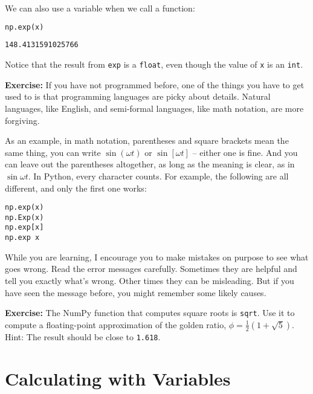 We can also use a variable when we call a function:

\begin{lstlisting}[language=Python,style=source]
np.exp(x)
\end{lstlisting}

\begin{lstlisting}[style=output]
148.4131591025766
\end{lstlisting}

Notice that the result from \passthrough{\lstinline!exp!} is a
\passthrough{\lstinline!float!}, even though the value of
\passthrough{\lstinline!x!} is an \passthrough{\lstinline!int!}.

\textbf{Exercise:} If you have not programmed before, one of the things
you have to get used to is that programming languages are picky about
details. Natural languages, like English, and semi-formal languages,
like math notation, are more forgiving.

As an example, in math notation, parentheses and square brackets mean
the same thing, you can write \(\sin (\omega t)\) or \(\sin [\omega t]\)
-- either one is fine. And you can leave out the parentheses altogether,
as long as the meaning is clear, as in \(\sin \omega t\). In Python,
every character counts. For example, the following are all different,
and only the first one works:

\begin{lstlisting}[style=output]
np.exp(x)
np.Exp(x)
np.exp[x]
np.exp x
\end{lstlisting}

While you are learning, I encourage you to make mistakes on purpose to
see what goes wrong. Read the error messages carefully. Sometimes they
are helpful and tell you exactly what's wrong. Other times they can be
misleading. But if you have seen the message before, you might remember
some likely causes.

\textbf{Exercise:} The NumPy function that computes square roots is
\passthrough{\lstinline!sqrt!}. Use it to compute a floating-point
approximation of the golden ratio, \(\phi = \frac{1}{2}(1 + \sqrt{5})\).
Hint: The result should be close to \passthrough{\lstinline!1.618!}.

\section{Calculating with Variables}\label{calculating-with-variables}

